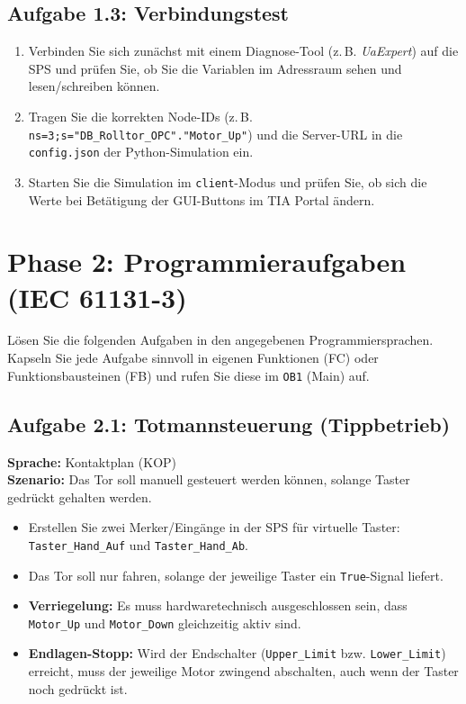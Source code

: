 \documentclass[11pt,a4paper]{article}
\begin{document}
\subsection{Aufgabe 1.3: Verbindungstest}
\begin{enumerate}[noitemsep]
    \item Verbinden Sie sich zunächst mit einem Diagnose-Tool (z.\,B. \textit{UaExpert}) auf die SPS und prüfen Sie, ob Sie die Variablen im Adressraum sehen und lesen/schreiben können.
    \item Tragen Sie die korrekten Node-IDs (z.\,B. \texttt{ns=3;s="DB\_Rolltor\_OPC"."Motor\_Up"}) und die Server-URL in die \texttt{config.json} der Python-Simulation ein.
    \item Starten Sie die Simulation im \texttt{client}-Modus und prüfen Sie, ob sich die Werte bei Betätigung der GUI-Buttons im TIA Portal ändern.
\end{enumerate}

\newpage

\section{Phase 2: Programmieraufgaben (IEC 61131-3)}

Lösen Sie die folgenden Aufgaben in den angegebenen Programmiersprachen. Kapseln Sie jede Aufgabe sinnvoll in eigenen Funktionen (FC) oder Funktionsbausteinen (FB) und rufen Sie diese im \texttt{OB1} (Main) auf.

\subsection{Aufgabe 2.1: Totmannsteuerung (Tippbetrieb)}
\textbf{Sprache:} Kontaktplan (KOP) \\
\textbf{Szenario:} Das Tor soll manuell gesteuert werden können, solange Taster gedrückt gehalten werden.
\begin{itemize}
    \item Erstellen Sie zwei Merker/Eingänge in der SPS für virtuelle Taster: \texttt{Taster\_Hand\_Auf} und \texttt{Taster\_Hand\_Ab}.
    \item Das Tor soll nur fahren, solange der jeweilige Taster ein \texttt{True}-Signal liefert.
    \item \textbf{Verriegelung:} Es muss hardwaretechnisch ausgeschlossen sein, dass \texttt{Motor\_Up} und \texttt{Motor\_Down} gleichzeitig aktiv sind.
    \item \textbf{Endlagen-Stopp:} Wird der Endschalter (\texttt{Upper\_Limit} bzw. \texttt{Lower\_Limit}) erreicht, muss der jeweilige Motor zwingend abschalten, auch wenn der Taster noch gedrückt ist.
\end{itemize}
\end{document}
